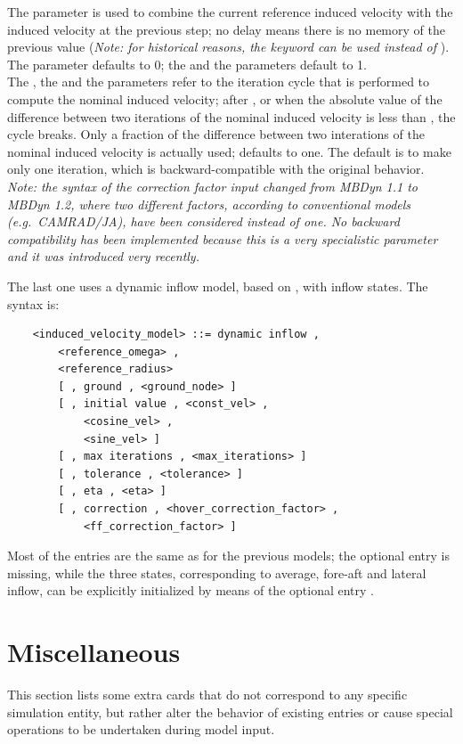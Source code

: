 The  parameter is used to
combine the current reference induced velocity with the induced velocity
at the previous step; no delay means there is no memory of the previous value 
(\emph{Note: for historical reasons, the keyword 
can be used instead of }). \\
The  parameter defaults to 0; 
the  
and the  parameters default to 1. \\
The , the  
and the  parameters refer to the iteration cycle 
that is performed to compute the nominal induced velocity; 
after , or when the absolute value 
of the difference between two iterations of the nominal induced 
velocity is less than , the cycle breaks.
Only a fraction  of the difference between two
interations of the nominal induced velocity is actually
used;  defaults to one.
The default is to make only one iteration, which is backward-compatible
with the original behavior.
\emph{
	Note: the syntax of the correction factor input changed
	from MBDyn 1.1 to MBDyn 1.2, where two different factors,
	according to conventional models (e.g.\ CAMRAD/JA), have
	been considered instead of one.
	No backward compatibility has been implemented because 
	this is a very specialistic parameter and it was introduced 
	very recently.
}

\noindent
The last one uses a dynamic inflow model, based on \cite{PITT},
with inflow states.
The syntax is:
\begin{verbatim}
    <induced_velocity_model> ::= dynamic inflow , 
        <reference_omega> , 
        <reference_radius> 
        [ , ground , <ground_node> ]
        [ , initial value , <const_vel> ,
            <cosine_vel> ,
            <sine_vel> ]
        [ , max iterations , <max_iterations> ]
        [ , tolerance , <tolerance> ]
        [ , eta , <eta> ]
        [ , correction , <hover_correction_factor> ,
            <ff_correction_factor> ]
\end{verbatim}
Most of the entries are the same as for the previous models;
the  optional entry is missing, while the three states, 
corresponding to average, fore-aft and lateral inflow,
can be explicitly initialized by means of the optional 
entry .



\section{Miscellaneous}
This section lists some extra cards that do not correspond to any
specific simulation entity, but rather alter the behavior 
of existing entries or cause special operations to be undertaken
during model input.

